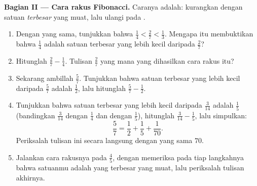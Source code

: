 \begin{problem}
\medskip
\noindent\textbf{Bagian II --- Cara rakus Fibonacci.}
Caranya adalah: kurangkan dengan  satuan \emph{terbesar} yang
muat, lalu ulangi pada .
\begin{enumerate}[resume]
  \item Dengan  yang sama, tunjukkan bahwa
        $\frac14 < \frac27 < \frac13$. Mengapa itu membuktikan bahwa
        $\frac14$ adalah  satuan terbesar yang lebih kecil
        daripada $\frac27$?
  \item Hitunglah $\frac27 - \frac14$. Tulisan $\frac27$ yang mana
        yang dihasilkan cara rakus itu?
  \item Sekarang ambillah $\frac57$. Tunjukkan bahwa  satuan
        terbesar yang lebih kecil daripada $\frac57$ adalah
        $\frac12$, lalu hitunglah $\frac57 - \frac12$.
  \item Tunjukkan bahwa  satuan terbesar yang lebih kecil
        daripada $\frac{3}{14}$ adalah $\frac15$ (bandingkan
        $\frac{3}{14}$ dengan $\frac14$ dan dengan $\frac15$),
        hitunglah $\frac{3}{14} - \frac15$, lalu simpulkan:
        \[
        \frac57 = \frac12 + \frac15 + \frac{1}{70} .
        \]
        Periksalah tulisan ini secara langsung dengan  yang
        sama $70$.
  \item Jalankan cara rakusnya pada $\frac45$, dengan memeriksa pada
        tiap langkahnya bahwa  satuanmu adalah yang terbesar
        yang muat, lalu periksalah tulisan akhirnya.
\end{enumerate}


\end{problem}
